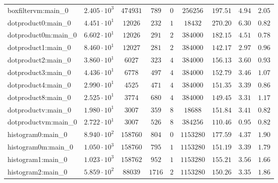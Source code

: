 \begin{tabular}{|l|c|c|c|c|c|c|c|c|}
boxfiltervm:main\_0            & $ 2.405 \cdot 10^{3} $ & $ 474931   $ & $ 789    $ & $ 0    $ & $ 256256   $ & $ 197.51      $ & $ 4.94    $ & $ 2.05    $ \\
dotproduct0:main\_0            & $ 4.451 \cdot 10^{1} $ & $ 12026    $ & $ 232    $ & $ 1    $ & $ 18432    $ & $ 270.20      $ & $ 6.30    $ & $ 0.82    $ \\
dotproduct0m:main\_0           & $ 6.602 \cdot 10^{1} $ & $ 12026    $ & $ 291    $ & $ 2    $ & $ 384000   $ & $ 182.15      $ & $ 4.51    $ & $ 0.78    $ \\
dotproduct1:main\_0            & $ 8.460 \cdot 10^{1} $ & $ 12027    $ & $ 281    $ & $ 2    $ & $ 384000   $ & $ 142.17      $ & $ 2.97    $ & $ 0.96    $ \\
dotproduct2:main\_0            & $ 3.860 \cdot 10^{1} $ & $ 6027     $ & $ 323    $ & $ 4    $ & $ 384000   $ & $ 156.13      $ & $ 3.60    $ & $ 0.93    $ \\
dotproduct3:main\_0            & $ 4.436 \cdot 10^{1} $ & $ 6778     $ & $ 497    $ & $ 4    $ & $ 384000   $ & $ 152.79      $ & $ 3.46    $ & $ 1.07    $ \\
dotproduct4:main\_0            & $ 2.990 \cdot 10^{1} $ & $ 4525     $ & $ 471    $ & $ 4    $ & $ 384000   $ & $ 151.35      $ & $ 3.39    $ & $ 0.86    $ \\
dotproduct8:main\_0            & $ 2.525 \cdot 10^{1} $ & $ 3774     $ & $ 680    $ & $ 4    $ & $ 384000   $ & $ 149.45      $ & $ 3.31    $ & $ 1.17    $ \\
dotproductv:main\_0            & $ 1.980 \cdot 10^{1} $ & $ 3007     $ & $ 359    $ & $ 8    $ & $ 18688    $ & $ 151.84      $ & $ 3.41    $ & $ 0.82    $ \\
dotproductvm:main\_0           & $ 2.722 \cdot 10^{1} $ & $ 3007     $ & $ 526    $ & $ 8    $ & $ 384256   $ & $ 110.46      $ & $ 0.95    $ & $ 0.82    $ \\
histogram0:main\_0             & $ 8.940 \cdot 10^{2} $ & $ 158760   $ & $ 804    $ & $ 0    $ & $ 1153280  $ & $ 177.59      $ & $ 4.37    $ & $ 1.90    $ \\
histogram0m:main\_0            & $ 1.050 \cdot 10^{3} $ & $ 158760   $ & $ 795    $ & $ 1    $ & $ 1153280  $ & $ 151.19      $ & $ 3.39    $ & $ 1.79    $ \\
histogram1:main\_0             & $ 1.023 \cdot 10^{3} $ & $ 158762   $ & $ 952    $ & $ 1    $ & $ 1153280  $ & $ 155.21      $ & $ 3.56    $ & $ 1.66    $ \\
histogram2:main\_0             & $ 5.859 \cdot 10^{2} $ & $ 88039    $ & $ 1716   $ & $ 2    $ & $ 1153280  $ & $ 150.26      $ & $ 3.35    $ & $ 1.86    $ \\

\end{tabular}
